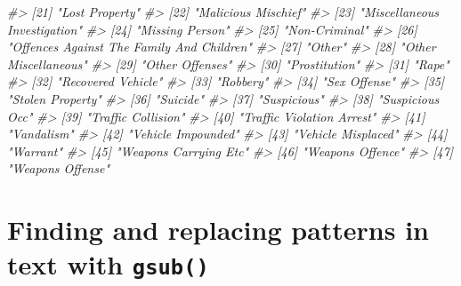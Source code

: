 \documentclass[
  12pt,
]{book}
\newenvironment{Shaded}{\begin{snugshade}}{\end{snugshade}}
\newcommand{\CommentTok}[1]{\textcolor[rgb]{0.37,0.37,0.37}{\textit{#1}}}
\begin{document}
\begin{Shaded}
\begin{Highlighting}[]
\CommentTok{\#\textgreater{} [21] "Lost Property"                             }
\CommentTok{\#\textgreater{} [22] "Malicious Mischief"                        }
\CommentTok{\#\textgreater{} [23] "Miscellaneous Investigation"               }
\CommentTok{\#\textgreater{} [24] "Missing Person"                            }
\CommentTok{\#\textgreater{} [25] "Non{-}Criminal"                              }
\CommentTok{\#\textgreater{} [26] "Offences Against The Family And Children"  }
\CommentTok{\#\textgreater{} [27] "Other"                                     }
\CommentTok{\#\textgreater{} [28] "Other Miscellaneous"                       }
\CommentTok{\#\textgreater{} [29] "Other Offenses"                            }
\CommentTok{\#\textgreater{} [30] "Prostitution"                              }
\CommentTok{\#\textgreater{} [31] "Rape"                                      }
\CommentTok{\#\textgreater{} [32] "Recovered Vehicle"                         }
\CommentTok{\#\textgreater{} [33] "Robbery"                                   }
\CommentTok{\#\textgreater{} [34] "Sex Offense"                               }
\CommentTok{\#\textgreater{} [35] "Stolen Property"                           }
\CommentTok{\#\textgreater{} [36] "Suicide"                                   }
\CommentTok{\#\textgreater{} [37] "Suspicious"                                }
\CommentTok{\#\textgreater{} [38] "Suspicious Occ"                            }
\CommentTok{\#\textgreater{} [39] "Traffic Collision"                         }
\CommentTok{\#\textgreater{} [40] "Traffic Violation Arrest"                  }
\CommentTok{\#\textgreater{} [41] "Vandalism"                                 }
\CommentTok{\#\textgreater{} [42] "Vehicle Impounded"                         }
\CommentTok{\#\textgreater{} [43] "Vehicle Misplaced"                         }
\CommentTok{\#\textgreater{} [44] "Warrant"                                   }
\CommentTok{\#\textgreater{} [45] "Weapons Carrying Etc"                      }
\CommentTok{\#\textgreater{} [46] "Weapons Offence"                           }
\CommentTok{\#\textgreater{} [47] "Weapons Offense"}
\end{Highlighting}
\end{Shaded}

\hypertarget{finding-and-replacing-patterns-in-text-with-gsub}{%
\section{\texorpdfstring{Finding and replacing patterns in text with \texttt{gsub()}}{Finding and replacing patterns in text with gsub()}}\label{finding-and-replacing-patterns-in-text-with-gsub}}
\end{document}
